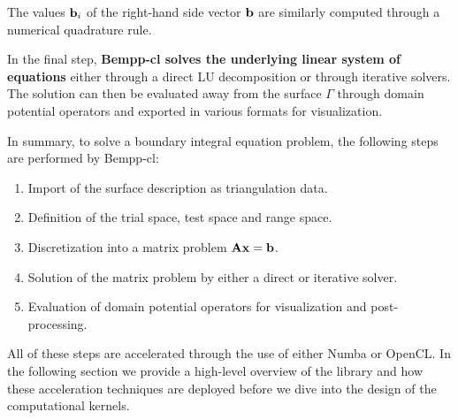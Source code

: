 The values $\mathbf{b}_i$ of the right-hand side vector $\mathbf{b}$ are similarly computed through a numerical quadrature rule.

In the final step, \textbf{Bempp-cl solves the underlying linear system of equations} either through a direct LU decomposition or through iterative solvers. The solution can then be evaluated away from the surface $\Gamma$ through domain potential operators and exported in various formats for visualization.

In summary, to solve a boundary integral equation problem, the following steps are performed by Bempp-cl:
\begin{enumerate}
	\item Import of the surface description as triangulation data.
	\item Definition of the trial space, test space and range space.
	\item Discretization into a matrix problem $\mathbf{A}\mathbf{x}=\mathbf{b}$.
	\item Solution of the matrix problem by either a direct or iterative solver.
	\item Evaluation of domain potential operators for visualization and post-processing.
\end{enumerate}

All of these steps are accelerated through the use of either Numba or OpenCL. In the following section we provide a high-level overview of the library and how these acceleration techniques are deployed before we dive into the design of the computational kernels.
